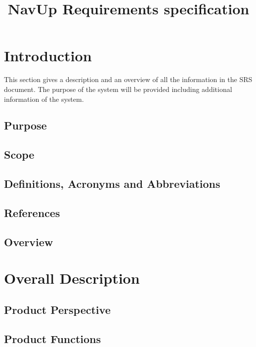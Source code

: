 \documentclass{article}
\begin{document}
\title{NavUp Requirements specification}
\maketitle

\clearpage
\tableofcontents

\clearpage
\section{Introduction}

This section gives a description and an overview of all the information in the SRS document. The purpose of the system will be provided including additional information of the system.

	\subsection{Purpose}
	
	
	\subsection{Scope}
	

	\subsection{Definitions, Acronyms and Abbreviations}
	
	
	\subsection{References}
	
	
	\subsection{Overview}
	

\section{Overall Description}
	\subsection{Product Perspective}
	

	\subsection{Product Functions}
	
	
\end{document}
